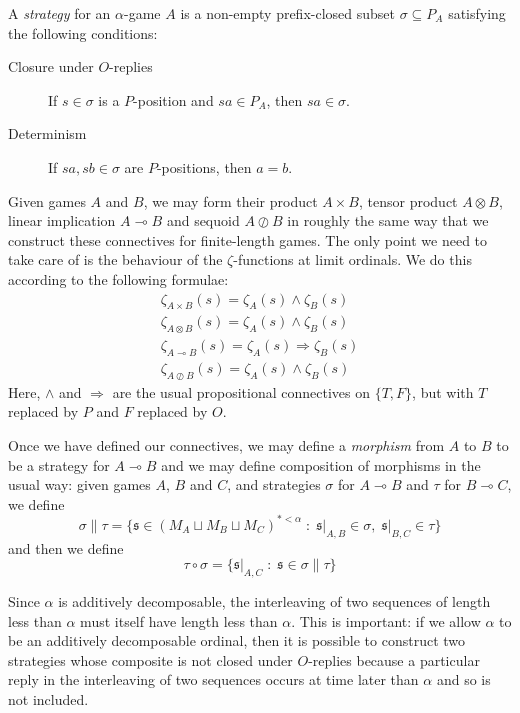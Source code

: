\documentclass[a4paper,UKenglish]{lipics-v2016}
\theoremstyle{plain}
\theoremstyle{definition}
\newcommand{\tensor}{\otimes}
\newcommand{\sequoid}{\oslash}
\renewcommand{\implies}{\multimap}
\newcommand{\comp}[2]{#1 \circ #2}
\newcommand{\cprd}{\sqcup}
\newcommand{\suchthat}{\;\colon\;}
\renewcommand{\subset}{\subseteq}
\newcommand{\s}{\mathfrak{s}}
\newlength{\arrow}
\begin{document}
\begin{definition}
  A \emph{strategy} for an $\alpha$-game $A$ is a non-empty prefix-closed subset $\sigma\subset P_A$ satisfying the following conditions:
  \begin{description}
    \item[Closure under $O$-replies] If $s\in\sigma$ is a $P$-position and $sa\in P_A$, then $sa\in\sigma$.
    \item[Determinism] If $sa,sb\in\sigma$ are $P$-positions, then $a=b$.
  \end{description}
\end{definition}

Given games $A$ and $B$, we may form their product $A\times B$, tensor product $A\tensor B$, linear implication $A\implies B$ and sequoid $A\sequoid B$ in roughly the same way that we construct these connectives for finite-length games.  The only point we need to take care of is the behaviour of the $\zeta$-functions at limit ordinals.  We do this according to the following formulae:
\begin{gather*}
  \zeta_{A\times B}(s) = \zeta_A(s) \wedge \zeta_B(s) \\
  \zeta_{A\tensor B}(s) = \zeta_A(s) \wedge \zeta_B(s) \\
  \zeta_{A\implies B}(s) = \zeta_A(s) \Rightarrow \zeta_B(s) \\
  \zeta_{A\sequoid B}(s) = \zeta_A(s) \wedge \zeta_B(s)
\end{gather*}
Here, $\wedge$ and $\Rightarrow$ are the usual propositional connectives on $\{T,F\}$, but with $T$ replaced by $P$ and $F$ replaced by $O$.

Once we have defined our connectives, we may define a \emph{morphism} from $A$ to $B$ to be a strategy for $A\implies B$ and we may define composition of morphisms in the usual way: given games $A$, $B$ and $C$, and strategies $\sigma$ for $A\implies B$ and $\tau$ for $B\implies C$, we define
\[
  \sigma\|\tau = \{\s\in (M_A \cprd M_B \cprd M_C)^{*<\alpha}\suchthat \s\vert_{A,B}\in\sigma,\;\s\vert_{B,C}\in\tau\}
  \]
and then we define
\[
  \comp\tau\sigma = \{\s\vert_{A,C}\suchthat\s\in\sigma\|\tau\}
  \]
\begin{remark}
  Since $\alpha$ is additively decomposable, the interleaving of two sequences of length less than $\alpha$ must itself have length less than $\alpha$.  This is important: if we allow $\alpha$ to be an additively decomposable ordinal, then it is possible to construct two strategies whose composite is not closed under $O$-replies because a particular reply in the interleaving of two sequences occurs at time later than $\alpha$ and so is not included.
\end{remark}
\end{document}
